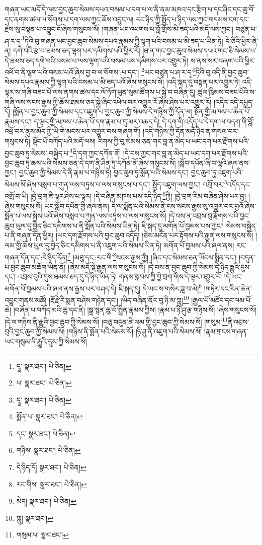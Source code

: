 གཞན་ཡང་མདོ་དེ་ལས་བྱང་ཆུབ་སེམས་དཔའ་བསམ་པ་དག་པ་ལ་ནི་ནམ་མཁའ་དང་རྩིག་པ་དང་ཤིང་དང་ཆུ་བོ་དང་ནགས་ཚལ་ལ་སོགས་པ་དག་ལས་ཀྱང་ཆོས་འབྱུང་ལ། རང་ཉིད་ཀྱི་སྤྱོད་པ་ཉིད་ལས་ཀྱང་གདམས་ངག་དང་རྗེས་སུ་བསྟན་པ་འབྱུང་ངོ་ཞེས་གསུངས་སོ། །གཞན་ཡང་འཕགས་པ་བློ་གྲོས་མི་ཟད་པའི་མདོ་ལས་ཀྱང་། བཙུན་པ་ཤ་ར་དྭ་\footnote{དྭཱ་  སྣར་ཐང་།  པེ་ཅིན། }ཏིའི་བུ་གཞན་ཡང་བྱང་ཆུབ་སེམས་དཔའ་རྣམས་ཀྱི་ལྷག་པའི་བསམ་པ་མི་ཟད་པ་ཡིན་ཏེ། དེ་ཅིའི་ཕྱིར་ཞེ་ན། དགེ་བའི་རྩ་བ་ཐམས་ཅད་ལྷག་པར་དམིགས་པའི་ཕྱིར་རོ། །ཐ་ན་གང་བྱང་ཆུབ་སེམས་དཔའ་གང་ཅི་སེམས་པ་དེ་ཐམས་ཅད་དགེ་བའི་བསམ་པ་ལས་ལྷག་པའི་བསམ་པས་དམིགས་པར་འགྱུར་ཏེ། ས་ནས་སར་བཞག་པའི་ཕྱིར་འཕོ་བ་ནི་ལྷག་པའི་བསམ་པའོ་ཞེས་བྱ་བ་ལ་སོགས་:པ་དང་། \footnote{པ་  སྣར་ཐང་།  པེ་ཅིན། }ཡང་བཙུན་པ་ཤ་ར་དྭ་\footnote{དྭཱ་  སྣར་ཐང་།  པེ་ཅིན། }ཏིའི་བུ་འདི་ནི་བྱང་ཆུབ་སེམས་དཔའ་རྣམས་ཀྱི་ལྷག་པའི་བསམ་པ་མི་ཟད་པའོ་ཞེས་གསུངས་སོ། །འདི་སྐད་དུ་བསྟན་པར་འགྱུར་ཏེ། འདི་ལྟར་ས་གཞི་བཟང་པོ་ལས་ནགས་ཚལ་དང་ལོ་ཏོག་ཕུན་སུམ་ཚོགས་པ་སྐྱེ་བ་བཞིན་དུ། ཚུལ་ཁྲིམས་བཟང་པོའི་ས་གཞི་ལས་སངས་རྒྱས་ཀྱི་ཆོས་ཐམས་ཅད་སྐྱེ་ཞིང་འཕེལ་བར་འགྱུར་རོ་ཞེས་ཤེས་པར་འགྱུར་རོ། །འདིར་འདི་དཔྱད་དོ། །སྨོན་པ་བྱང་ཆུབ་ཀྱི་སེམས་དང་འཇུག་པ་བྱང་ཆུབ་ཀྱི་སེམས་དེ་གཉིས་ཀྱི་དོན་ལ། སྔོན་གྱི་མཁས་པ་ཆེན་པོ་རྣམས་དང་། ད་ལྟར་གྱི་མཁས་པ་ཆེན་པོ་དག་རྣམ་པ་དུ་མར་འཆད་དེ། དེ་དག་གི་འདོད་པ་དེ་དག་ལ་བདག་གི་བློ་འཕྲོ་བར་ནུས་མོད་ཀྱི་ཡི་གེ་མངས་པར་འགྱུར་བས་གཞག་གོ། །འདི་གཉིས་ཀྱི་དོན་མདོ་ཉིད་ན་གསལ་བར་གསུངས་ཏེ། སྡོང་པོ་བཀོད་པའི་མདོ་ལས། རིགས་ཀྱི་བུ་སེམས་ཅན་གང་བླ་ན་མེད་པ་ཡང་དག་པར་རྫོགས་པའི་བྱང་ཆུབ་ཏུ་སེམས་:བསྐྱེད་པ་\footnote{སྨོན་པ་  སྣར་ཐང་།  པེ་ཅིན། }དེ་དག་ཀྱང་དཀོན་ནོ། །དེ་བས་ཀྱང་གང་བླ་ན་མེད་པ་ཡང་དག་པར་རྫོགས་པའི་བྱང་ཆུབ་ཏུ་ཆས་པའི་སེམས་ཅན་དེ་དག་ནི་ཤིན་ཏུ་དཀོན་ནོ་ཞེས་གསུངས་སོ། །སློབ་དཔོན་ཞི་བ་ལྷའི་ཞལ་ནས་ཀྱང་། བྱང་ཆུབ་ཀྱི་སེམས་དེ་ནི་རྣམ་པ་གཉིས་ཏེ། བྱང་ཆུབ་ཏུ་སྨོན་པའི་སེམས་དང་། བྱང་ཆུབ་ཏུ་འཇུག་པའི་སེམས་སོ་ཞེས་བསླབ་པ་ཀུན་ལས་བཏུས་པ་ལས་གསུངས་པ་དང་། སྤྱོད་འཇུག་ལས་ཀྱང་། འགྲོ་བར་\footnote{དང་  སྣར་ཐང་།  པེ་ཅིན། }འདོད་དང་འགྲོ་བ་ཡི། །བྱེ་བྲག་ཇི་ལྟར་ཤེས་པ་ལྟར། །དེ་བཞིན་མཁས་པས་འདི་ཉིད་\footnote{གཉིས་  སྣར་ཐང་།  པེ་ཅིན། }ཀྱི། །བྱེ་བྲག་རིམ་བཞིན་ཤེས་པར་བྱ། །ཞེས་གསུངས་སོ། ཡང་སློབ་དཔོན་གྱི་ཞལ་ནས། དེ་ལ་སྨོན་པའི་སེམས་ནི་ངས་སངས་རྒྱས་སུ་འགྱུར་བར་བྱའོ་ཞེས་སྨོན་པ་ལས་སྐྱེས་པའོ་ཞེས་བསླབ་པ་ཀུན་ལས་བཏུས་པ་ལས་གསུངས་སོ། །དེ་བས་ན་འབྲས་བུ་རྫོགས་པའི་བྱང་ཆུབ་ཡུལ་དུ་བྱེད་ཅིང་དམིགས་པ་ནི་སྨོན་པའི་སེམས་ཡིན་ཏེ། ཇི་སྐད་དུ་མགོན་པོ་བྱམས་པས་ཀྱང་། སེམས་བསྐྱེད་པ་ནི་གཞན་དོན་ཕྱིར། །ཡང་དག་རྫོགས་པའི་བྱང་ཆུབ་འདོད། །ཅེས་མངོན་པར་རྟོགས་པའི་རྒྱན་ལས་གསུངས་སོ། །ལམ་གྱི་ཆོས་ཡུལ་དུ་བྱེད་ཅིང་དམིགས་པ་ནི་འཇུག་པའི་སེམས་ཡིན་ཏེ། མགོན་པོ་བྱམས་པའི་ཞལ་ནས། རང་གཞན་དོན་དང་:དེ་ཉིད་དོན།\footnote{དེ་ཉིད་དོ།  སྣར་ཐང་།  པེ་ཅིན། } །མཐུ་དང་:རང་གི་\footnote{རང་གིས་  སྣར་ཐང་།  པེ་ཅིན། }སངས་རྒྱས་ཀྱི། །ཞིང་དང་སེམས་ཅན་ཡོངས་སྨིན་དང་། །བདུན་པ་བྱང་ཆུབ་མཆོག་ཡིན་ནོ། །ཞེས་མདོ་སྡེ་རྒྱན་ལས་གསུངས་སོ། །དེ་བས་ན་བྱང་ཆུབ་ཀྱི་སེམས་དེ་ཉིད་རྒྱུའི་དུས་དང་། འབྲས་བུའི་དུས་ཐམས་ཅད་དུ་དེ་ཉིད་ཡིན་ཏེ། གནས་སྐབས་ཀྱི་བྱེ་བྲག་གིས་དེ་ལྟར་འགྱུར་རོ། །དེ་ཡང་མགོན་པོ་བྱམས་པའི་ཞལ་ནས་རྒྱས་པར་བཤད་དེ། ཇི་སྐད་དུ། དེ་ཡང་ས་གསེར་ཟླ་བ་མེ།\footnote{མེད།  སྣར་ཐང་།  པེ་ཅིན། } །གཏེར་དང་རིན་ཆེན་འབྱུང་གནས་མཚོ། །རྡོ་རྗེ་རི་སྨན་བཤེས་གཉེན་དང་། །ཡིད་བཞིན་ནོར་བུ་ཉི་མ་ཀླུ།\footnote{གླུ།  སྣར་ཐང་། } །རྒྱལ་པོ་མཛོད་དང་ལམ་པོ་ཆེ། །བཞོན་པ་བཀོད་མའི་ཆུ་དང་ནི། །སྒྲ་སྙན་ཆུ་བོ་སྤྲིན་རྣམས་ཀྱིས། །རྣམ་པ་ཉི་ཤུ་རྩ་གཉིས་སོ། །ཞེས་གསུངས་སོ། །དེ་ལ་གཉིས་ནི་རྒྱུའི་བྱང་ཆུབ་ཀྱི་སེམས་སོ། །བཅུ་བདུན་ནི་ལམ་གྱི་བྱང་ཆུབ་ཀྱི་སེམས་སོ། །གསུམ་\footnote{གསུམ་པ་  སྣར་ཐང་། }ནི་འབྲས་བུའི་བྱང་ཆུབ་ཀྱི་སེམས་སོ། །གཉིས་ནི་སྨོན་པའི་སེམས་སོ། །ཉི་ཤུ་ནི་འཇུག་པའི་སེམས་སོ། །རྣམ་གྲངས་གཞན་ཡང་གསུམ་ནི་རྒྱུའི་དུས་ཀྱི་སེམས་སོ། 